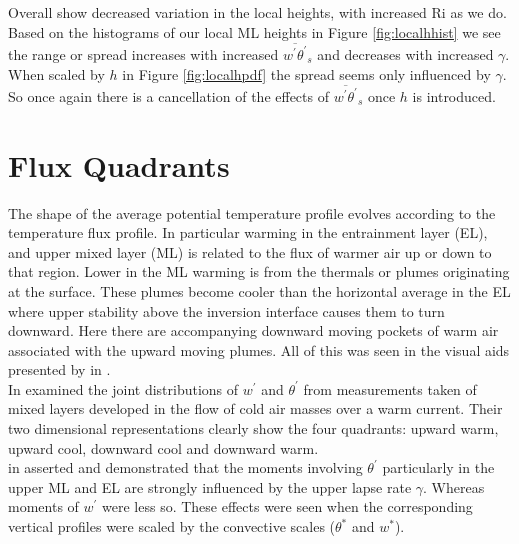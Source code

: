 Overall \citeauthor{SullMoengStev} 
\cite{SullMoengStev} show decreased variation in the local heights, with increased \acs{Ri} as we do.  Based on the histograms of our local \acs{ML} heights in Figure \ref{fig:localhhist} we see the range or spread
increases with increased $\overline{w^{'}\theta^{'}}_{s}$ and decreases with increased
$\gamma$.  When scaled by $h$ in Figure \ref{fig:localhpdf} the spread seems only influenced by $\gamma$.  So once
again there is a cancellation of the effects of $\overline{w^{'}\theta^{'}}_{s}$ once
$h$ is introduced.


\section{Flux Quadrants}
\label{sec:fluxquadrants}     
\FloatBarrier

The shape of the average potential temperature profile evolves according to the temperature flux
profile. In particular warming in the entrainment layer (\acs{EL}), and upper mixed layer (\acs{ML})
is related to the flux of warmer air up or down to that region.  Lower in the \acs{ML} warming is 
from the thermals or plumes originating at the surface.  These plumes become cooler than the horizontal
average in the \acs{EL} where upper stability above the inversion interface causes them to turn downward.
Here there are accompanying downward moving pockets of warm air associated with the upward moving
plumes.  All of this was seen in the visual aids presented by \citeauthor{SullMoengStev} in \cite{SullMoengStev}.\\

In \cite{MahrtPaum} \citeauthor{MahrtPaum} examined the joint distributions of $w^{'}$ and $\theta^{'}$ 
from measurements taken of mixed layers developed in the flow of cold air masses over a warm current.
Their two dimensional representations clearly show the four quadrants: upward warm, upward cool, downward cool
and downward warm.\\

\citeauthor{Sorbjan} in \cite{Sorbjan} asserted and demonstrated that the moments involving $\theta^{'}$
particularly in the upper \acs{ML} and \acs{EL} are strongly influenced by the upper lapse rate $\gamma$.
Whereas moments of $w^{'}$ were less so.  These effects were seen when the corresponding vertical profiles
were scaled by the convective scales ($\theta^{*}$ and $w^{*}$).\\

